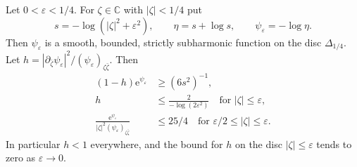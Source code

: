 \begin{lemma}\label{lem:extension-log-log-weight}
Let $0<\varepsilon<1/4$. For $\zeta\in\mathbb C$ with $|\zeta|<1/4$ put
\[
 s=-\log(|\zeta|^2+\varepsilon^2),\qquad
 \eta=s+\log s,\qquad\psi_\varepsilon=-\log\eta.
\]
Then $\psi_\varepsilon$ is a smooth, bounded, strictly subharmonic function on the disc $\Delta_{1/4}$. Let $h=|\partial_{\bar\zeta}\psi_\varepsilon|^2/(\psi_\varepsilon)_{\zeta\bar\zeta}$. Then
\[
 \begin{split}
 (1-h)\mathrm e^{\psi_\varepsilon}&\ge(6s^2)^{-1},\\
 h&\le\frac{2}{-\log(2\varepsilon^2)}\quad\text{for }|\zeta|\le\varepsilon,\\
 \frac{\mathrm e^{\psi_\varepsilon}}
 {|\zeta|^2(\psi_\varepsilon)_{\zeta\bar\zeta}}
     &\le25/4\quad\text{for }\varepsilon/2\le|\zeta|\le\varepsilon.
 \end{split}
\]
In particular $h<1$ everywhere, and the bound for $h$ on the disc $|\zeta|\le\varepsilon$ tends to zero as $\varepsilon\to0$.
\end{lemma}

